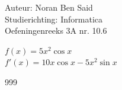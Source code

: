 \documentclass[a4paper]{article}
\begin{document}
  
\noindent \large Auteur: Noran Ben Said \\
\noindent \large Studierichting: Informatica\\
\noindent \large Oefeningenreeks 3A nr. 10.6\\

\medskip

\normalsize

$f(x) = 5x^2 \cos x $\\

$f'(x) = 10x\cos x-5x^2 \sin x $\\

\begin{thebibliography}{999}
\end{thebibliography}
\end{document}
